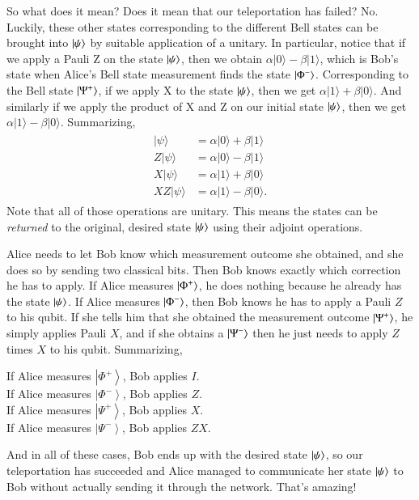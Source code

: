 So what does it mean? Does it mean that our teleportation has failed? No. Luckily, these other states corresponding to the different Bell states can be brought into $\left| \psi \right\rangle$ by suitable application of a unitary. In particular, notice that if we apply a Pauli Z on the state $\left| \psi \right\rangle$, then we obtain $\alpha|0\rangle-\beta|1\rangle$, which is Bob's state when Alice's Bell state measurement finds the state $\left| \Phi^- \right\rangle$. Corresponding to the Bell state $\left| \Psi^+ \right\rangle$, if we apply X to the state $\left| \psi \right\rangle$, then we get $\alpha|1\rangle+\beta|0\rangle$. And similarly if we apply the product of X and Z on our initial state $\left| \psi \right\rangle$, then we get $\alpha|1\rangle-\beta|0\rangle$. Summarizing,
\begin{align}
\begin{aligned}
|\psi\rangle &=\alpha|0\rangle+\beta|1\rangle \\
Z|\psi\rangle &=\alpha|0\rangle-\beta|1\rangle \\
X|\psi\rangle &=\alpha|1\rangle+\beta|0\rangle \\
X Z|\psi\rangle &=\alpha|1\rangle-\beta|0\rangle.
\end{aligned}
\end{align}
Note that all of those operations are unitary.  This means the states can be \emph{returned} to the original, desired state $\left| \psi \right\rangle$ using their adjoint operations.

Alice needs to let Bob know which measurement outcome she obtained, and she does so by sending two classical bits. Then Bob knows exactly which correction he has to apply. If Alice measures $\left| \Phi^+ \right\rangle$, he does nothing because he already has the state $\left| \psi \right\rangle$. If Alice measures $\left| \Phi^- \right\rangle$, then Bob knows he has to apply a Pauli $Z$ to his qubit. If she tells him that she obtained the measurement outcome $\left| \Psi^+ \right\rangle$, he simply applies Pauli $X$, and if she obtains a $\left| \Psi^- \right\rangle$ then he just needs to apply $Z$ times $X$ to his qubit.  Summarizing,

\noindent
If Alice measures $\left|\Phi^{+}\right\rangle$, Bob applies $I$.\\
If Alice measures $\left|\Phi^{-}\right\rangle$, Bob applies $Z$.\\
If Alice measures $\left|\Psi^{+}\right\rangle$, Bob applies $X$.\\
If Alice measures $\left|\Psi^{-}\right\rangle$, Bob applies $Z X$.

And in all of these cases, Bob ends up with the desired state $\left| \psi \right\rangle$, so our teleportation has succeeded and Alice managed to communicate her state $\left| \psi \right\rangle$ to Bob without actually sending it through the network. That's amazing!

